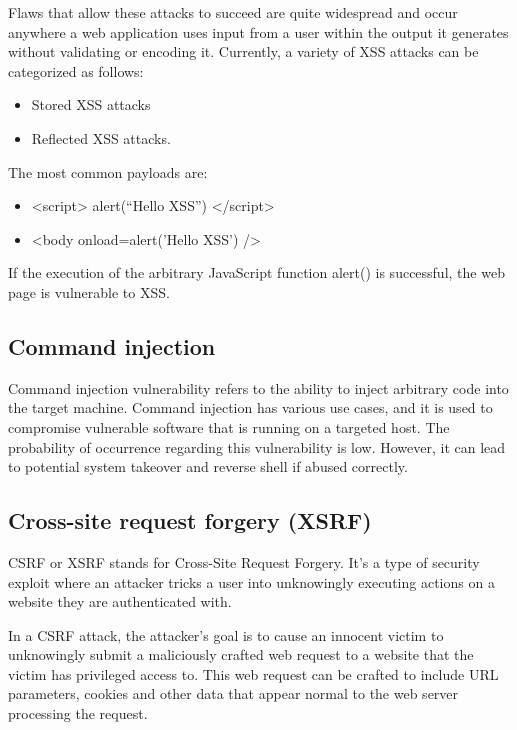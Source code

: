     Flaws that allow these attacks to succeed are quite widespread and occur anywhere a web application uses input from a user within the output it generates without validating or encoding it. 
    Currently, a variety of XSS attacks can be categorized as follows: 
    \begin{itemize}
        \item Stored XSS attacks 
        \item Reflected XSS attacks.
    \end{itemize}
    The most common payloads are: 
    \begin{itemize}
            \item <script> alert(“Hello XSS”) </script>
            \item <body onload=alert('Hello XSS') />
    \end{itemize}
    If the execution of the arbitrary JavaScript function alert() is successful, the web page is vulnerable to XSS.
    
\subsection{Command injection}
    
        Command injection vulnerability refers to the ability to inject arbitrary code into the target machine. Command injection has various use cases, and it is used to compromise vulnerable software that is running on a targeted host. The probability of occurrence regarding this vulnerability is low. 
        However, it can lead to potential system takeover and reverse shell if abused correctly.
    
\subsection{Cross-site request forgery (XSRF)}
    
        CSRF or XSRF stands for Cross-Site Request Forgery. It's a type of security exploit where an attacker tricks a user into unknowingly executing actions on a website they are authenticated with. 
        
        In a CSRF attack, the attacker's goal is to cause an innocent victim to unknowingly submit a maliciously crafted web request to a website that the victim has privileged access to. This web request can be crafted to include URL parameters, cookies and other data that appear normal to the web server processing the request.  
        
